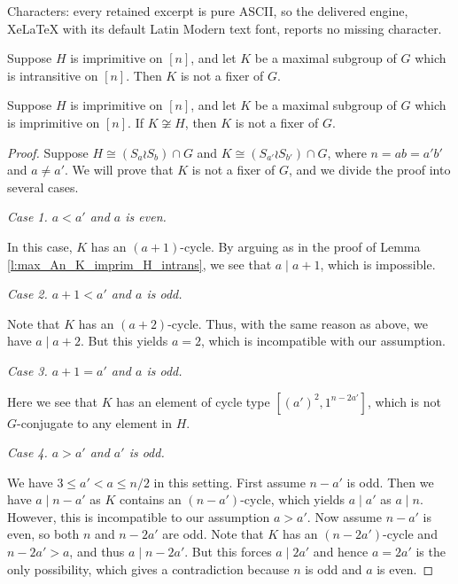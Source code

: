 \documentclass[10pt,a4paper]{amsart}
\newcommand{\leqs}{\leqslant}
\newcommand{\vs}{\vspace{2mm}}
\begin{document}
Characters: every retained excerpt is pure ASCII, so the delivered engine, XeLaTeX with its default Latin Modern text font, reports no missing character.
	\begin{lem}
		\label{l:max_An_K_imprim_H_intrans}
		Suppose $H$ is imprimitive on $[n]$, and let $K$ be a maximal subgroup of $G$ which is intransitive on $[n]$. Then $K$ is not a fixer of $G$.
	\end{lem}

	\begin{lem}
		\label{l:max_An_K_imprim_H_imprim}
		Suppose $H$ is imprimitive on $[n]$, and let $K$ be a maximal subgroup of $G$ which is imprimitive on $[n]$. If $K\not\cong H$, then $K$ is not a fixer of $G$.
	\end{lem}

	\begin{proof}
		Suppose $H\cong (S_a\wr S_b)\cap G$ and $K\cong (S_{a'}\wr S_{b'})\cap G$, where $n = ab = a'b'$ and $a\ne a'$. We will prove that $K$ is not a fixer of $G$, and we divide the proof into several cases.
		
		\vs
		
		\noindent \textit{Case 1. $a<a'$ and $a$ is even.}
		
		\vs
		
		In this case, $K$ has an $(a+1)$-cycle. By arguing as in the proof of Lemma \ref{l:max_An_K_imprim_H_intrans}, we see that $a\mid a+1$, which is impossible.
		
		\vs
		
		\noindent \textit{Case 2. $a+1<a'$ and $a$ is odd.}
		
		\vs
		
		Note that $K$ has an $(a+2)$-cycle. Thus, with the same reason as above, we have $a\mid a+2$. But this yields $a = 2$, which is incompatible with our assumption.
		
		\vs
		
		\noindent \textit{Case 3. $a+1=a'$ and $a$ is odd.}
		
		\vs
		
		Here we see that $K$ has an element of cycle type $[(a')^2,1^{n-2a'}]$, which is not $G$-conjugate to any element in $H$.
		
		\vs
		
		\noindent \textit{Case 4. $a > a'$ and $a'$ is odd.}
		
		\vs
		
		We have $3\leqs a' < a\leqs n/2$ in this setting. First assume $n-a'$ is odd. Then we have $a\mid n-a'$ as $K$ contains an $(n-a')$-cycle, which yields $a\mid a'$ as $a\mid n$. However, this is incompatible to our assumption $a > a'$. Now assume $n-a'$ is even, so both $n$ and $n-2a'$ are odd. Note that $K$ has an $(n-2a')$-cycle and $n-2a' > a$, and thus $a\mid n-2a'$. But this forces $a\mid 2a'$ and hence $a = 2a'$ is the only possibility, which gives a contradiction because $n$ is odd and $a$ is even.
		

\end{proof}
\end{document}
